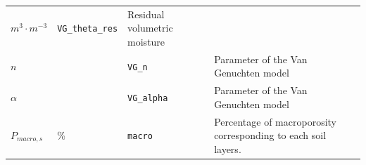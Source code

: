 \documentclass[]{book}
\begin{document}
\begin{longtable}[]{@{}llll@{}}
\begin{minipage}[t]{0.10\columnwidth}
\(m^3 \cdot m^{-3}\)\strut
\end{minipage} & \begin{minipage}[t]{0.12\columnwidth}\raggedright\strut
\texttt{VG\_theta\_res}\strut
\end{minipage} & \begin{minipage}[t]{0.45\columnwidth}\raggedright\strut
Residual volumetric moisture\strut
\end{minipage}\tabularnewline
\begin{minipage}[t]{0.11\columnwidth}\raggedright\strut
\(n\)\strut
\end{minipage} & \begin{minipage}[t]{0.10\columnwidth}\raggedright\strut
\strut
\end{minipage} & \begin{minipage}[t]{0.12\columnwidth}\raggedright\strut
\texttt{VG\_n}\strut
\end{minipage} & \begin{minipage}[t]{0.45\columnwidth}\raggedright\strut
Parameter of the Van Genuchten \citeyearpar{Genuchten1980} model\strut
\end{minipage}\tabularnewline
\begin{minipage}[t]{0.11\columnwidth}\raggedright\strut
\(\alpha\)\strut
\end{minipage} & \begin{minipage}[t]{0.10\columnwidth}\raggedright\strut
\strut
\end{minipage} & \begin{minipage}[t]{0.12\columnwidth}\raggedright\strut
\texttt{VG\_alpha}\strut
\end{minipage} & \begin{minipage}[t]{0.45\columnwidth}\raggedright\strut
Parameter of the Van Genuchten \citeyearpar{Genuchten1980} model\strut
\end{minipage}\tabularnewline
\begin{minipage}[t]{0.11\columnwidth}\raggedright\strut
\(P_{macro, s}\)\strut
\end{minipage} & \begin{minipage}[t]{0.10\columnwidth}\raggedright\strut
\%\strut
\end{minipage} & \begin{minipage}[t]{0.12\columnwidth}\raggedright\strut
\texttt{macro}\strut
\end{minipage} & \begin{minipage}[t]{0.45\columnwidth}\raggedright\strut
Percentage of macroporosity corresponding to each soil layers.\strut

\end{minipage}
\end{longtable}
\end{document}
